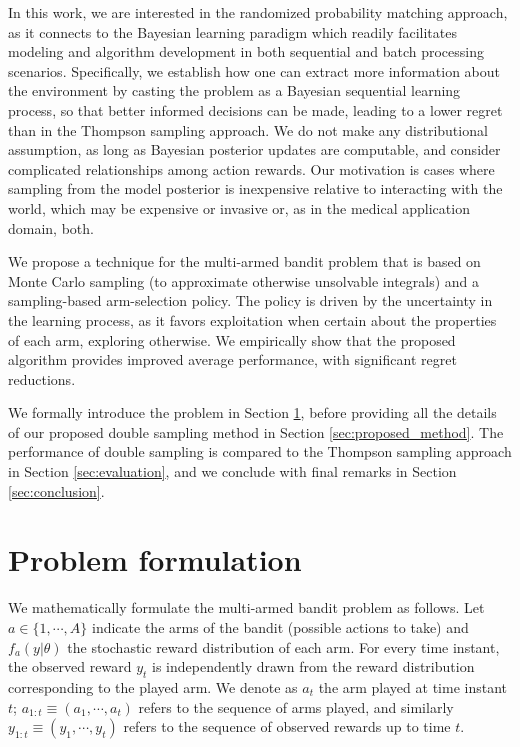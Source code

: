 \documentclass[10pt]{article}
\begin{document}
In this work, we are interested in the randomized probability matching approach, as it connects to the Bayesian learning paradigm which readily facilitates modeling and algorithm development in both sequential and batch processing scenarios. Specifically, we establish how one can extract more information about the environment by casting the problem as a Bayesian sequential learning process, so that better informed decisions can be made, leading to a lower regret than in the Thompson sampling approach. We do not make any distributional assumption, as long as Bayesian posterior updates are computable, and consider complicated relationships among action rewards. Our motivation is cases where sampling from the model posterior is inexpensive relative to interacting with the world, which may be expensive or invasive or, as in the medical application domain, both.

We propose a technique for the multi-armed bandit problem that is based on Monte Carlo sampling (to approximate otherwise unsolvable integrals) and a sampling-based arm-selection policy. The policy is driven by the uncertainty in the learning process, as it favors exploitation when certain about the properties of each arm, exploring otherwise. We empirically show that the proposed algorithm provides improved average performance, with significant regret reductions.

We formally introduce the problem in Section \ref{sec:problem_formulation}, before providing all the details of our proposed double sampling method in Section \ref{sec:proposed_method}. The performance of double sampling is compared to the Thompson sampling approach in Section \ref{sec:evaluation}, and we conclude with final remarks in Section \ref{sec:conclusion}.

\section{Problem formulation}
\label{sec:problem_formulation}

We mathematically formulate the multi-armed bandit problem as follows. Let $a\in\{1,\cdots,A\}$ indicate the arms of the bandit (possible actions to take) and $f_{a}(y|\theta)$ the stochastic reward distribution of each arm. For every time instant, the observed reward $y_t$ is independently drawn from the reward distribution corresponding to the played arm. We denote as $a_t$ the arm played at time instant $t$; $a_{1:t} \equiv (a_1, \cdots , a_t)$ refers to the sequence of arms played, and similarly $y_{1:t} \equiv (y_1, \cdots , y_t)$ refers to the sequence of observed rewards up to time $t$.
\end{document}
